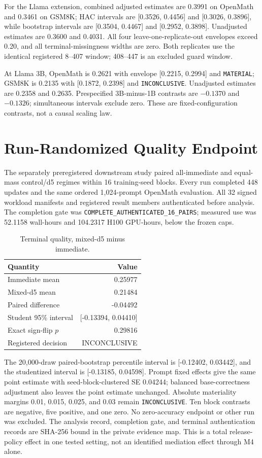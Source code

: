 \documentclass{article}
\begin{document}
For the Llama extension, combined adjusted estimates are 0.3991 on OpenMath and 0.3461 on GSM8K; HAC intervals are [0.3526, 0.4456] and [0.3026, 0.3896], while bootstrap intervals are [0.3504, 0.4467] and [0.2952, 0.3898]. Unadjusted estimates are 0.3600 and 0.4031. All four leave-one-replicate-out envelopes exceed 0.20, and all terminal-missingness widths are zero. Both replicates use the identical registered 8--407 window; 408--447 is an excluded guard window.

At Llama 3B, OpenMath is 0.2621 with envelope [0.2215, 0.2994] and \texttt{MATERIAL}; GSM8K is 0.2135 with [0.1872, 0.2398] and \texttt{INCONCLUSIVE}. Unadjusted estimates are 0.2358 and 0.2635. Prespecified 3B-minus-1B contrasts are $-0.1370$ and $-0.1326$; simultaneous intervals exclude zero. These are fixed-configuration contrasts, not a causal scaling law.

\section{Run-Randomized Quality Endpoint}
The separately preregistered downstream study paired all-immediate and equal-mass control/d5 regimes within 16 training-seed blocks. Every run completed 448 updates and the same ordered 1,024-prompt OpenMath evaluation. All 32 signed workload manifests and registered result members authenticated before analysis. The completion gate was \texttt{COMPLETE\_AUTHENTICATED\_16\_PAIRS}; measured use was 52.1158 wall-hours and 104.2317 H100 GPU-hours, below the frozen caps.

\begin{table}[h]
\caption{Terminal quality, mixed-d5 minus immediate.}
\centering\small
\begin{tabular}{lr}
\toprule
Quantity & Value \\
\midrule
Immediate mean & 0.25977 \\
Mixed-d5 mean & 0.21484 \\
Paired difference & -0.04492 \\
Student 95\% interval & [-0.13394, 0.04410] \\
Exact sign-flip $p$ & 0.29816 \\
Registered decision & INCONCLUSIVE \\
\bottomrule
\end{tabular}
\end{table}

The 20,000-draw paired-bootstrap percentile interval is [-0.12402, 0.03442], and the studentized interval is [-0.13185, 0.04598]. Prompt fixed effects give the same point estimate with seed-block-clustered SE 0.04244; balanced base-correctness adjustment also leaves the point estimate unchanged. Absolute materiality margins 0.01, 0.015, 0.025, and 0.03 remain \texttt{INCONCLUSIVE}. Ten block contrasts are negative, five positive, and one zero. No zero-accuracy endpoint or other run was excluded. The analysis record, completion gate, and terminal authentication records are SHA-256 bound in the private evidence map. This is a total release-policy effect in one tested setting, not an identified mediation effect through M4 alone.
\end{document}
